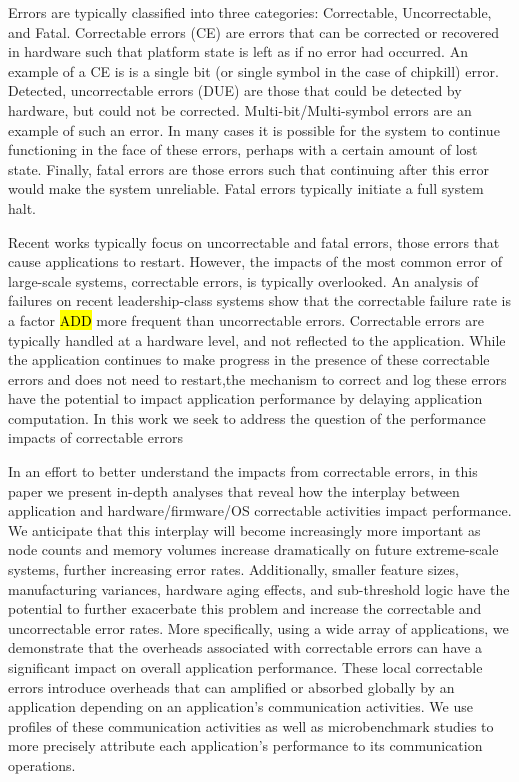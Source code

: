 Errors are typically classified into three categories: Correctable,
Uncorrectable, and Fatal. Correctable errors (CE) are errors that can be
corrected or recovered in hardware such that platform state is left as if no
error had occurred.  An example of a CE is is a single bit (or single symbol in
the case of chipkill) error.  Detected, uncorrectable errors (DUE) are those
that could be detected by hardware, but could not be corrected.
Multi-bit/Multi-symbol errors are an example of such an error.  In many cases it
is possible for the system to continue functioning in the face of these errors,
perhaps with a certain amount of lost state.  Finally, fatal errors are those
errors such that continuing after this error would make the system unreliable.
Fatal errors typically initiate a full system halt.

Recent works typically focus on uncorrectable and fatal errors, those errors that cause
applications to restart.  However, the impacts of the most common error of
large-scale systems, correctable errors, is typically overlooked. An analysis of
failures on recent leadership-class systems show that the correctable failure
rate is a factor \hl{ADD} more frequent than uncorrectable errors.  Correctable
errors are typically handled at a hardware level, and not reflected to the
application.  While the application continues to make progress in the presence
of these correctable errors and does not need to restart,the mechanism to
correct and log these errors have the potential to impact application
performance by delaying application computation. In this work we seek to address
the question of the performance impacts of correctable errors



In an effort to better understand the impacts from correctable errors, in this
paper we present in-depth analyses that reveal how the interplay between
application and hardware/firmware/OS correctable activities impact performance.
We anticipate that this interplay will become increasingly more important as
node counts and memory volumes increase dramatically on future extreme-scale
systems, further increasing error rates.  Additionally, smaller feature sizes,
manufacturing variances, hardware aging effects, and sub-threshold logic have
the potential to further exacerbate this problem and increase the correctable
and uncorrectable error rates.  More specifically, using a wide array of
applications, we demonstrate that the overheads associated with  correctable
errors can have a significant impact on overall application performance.  These
local correctable errors introduce overheads that can amplified or absorbed
globally by an application depending on an application's communication
activities.  We use profiles of these communication activities as well as
microbenchmark studies to more precisely attribute each application's
performance to its communication operations.

